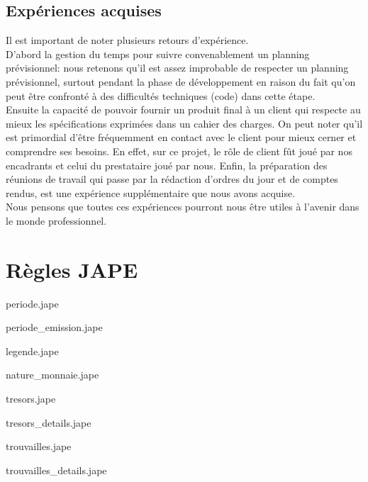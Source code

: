 \documentclass[a4paper, 11pt]{report}
\newcommand{\includecode}[1]{}
\begin{document}
\section{Expériences acquises}
Il est important de noter plusieurs retours d'expérience.\\D'abord la gestion du temps pour suivre convenablement un planning prévisionnel: nous retenons qu'il est assez improbable de respecter un planning prévisionnel, surtout pendant la phase de développement en raison du fait qu'on peut être confronté à des difficultés techniques (code) dans cette étape.\\
Ensuite la capacité de pouvoir fournir un produit final à un client qui respecte au mieux les spécifications exprimées dans un cahier des charges. On peut noter qu'il est primordial d'être fréquemment en contact avec le client pour mieux cerner et comprendre ses besoins. En effet, sur ce projet, le rôle de client fût joué par nos encadrants et celui du prestataire joué par nous.
Enfin, la préparation des réunions de travail qui passe par la rédaction d'ordres du jour et de comptes rendus, est une expérience supplémentaire que nous avons acquise.\\
Nous pensons que toutes ces expériences pourront nous être utiles à l'avenir dans le monde professionnel.
\newpage


\appendix
\chapter{Règles JAPE}
periode.jape
\includecode{code/temporelle/periode.jape}
periode\_emission.jape
\includecode{code/temporelle/periode_emission.jape}
legende.jape
\includecode{code/thematique/legende.jape}
nature\_monnaie.jape
\includecode{code/thematique/nature_monnaie.jape}
tresors.jape
\includecode{code/thematique/tresors.jape}
tresors\_details.jape
\includecode{code/thematique/tresors_details.jape}
trouvailles.jape
\includecode{code/thematique/trouvailles.jape}
trouvailles\_details.jape
\includecode{code/thematique/trouvailles_details.jape}
\end{document}
